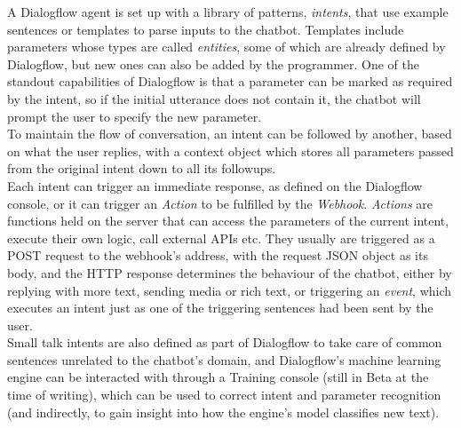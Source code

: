 A Dialogflow agent is set up with a library of patterns, \textit{intents}, that use example sentences or templates to parse inputs to the chatbot. Templates include parameters whose types are called \textit{entities}, some of which are already defined by Dialogflow, but new ones can also be added by the programmer. One of the standout capabilities of Dialogflow is that a parameter can be marked as required by the intent, so if the initial utterance does not contain it, the chatbot will prompt the user to specify the new parameter. \\
To maintain the flow of conversation, an intent can be followed by another, based on what the user replies, with a context object which stores all parameters passed from the original intent down to all its followups. \\
Each intent can trigger an immediate response, as defined on the Dialogflow console, or it can trigger an \textit{Action} to be fulfilled by the \textit{Webhook}. \textit{Actions} are functions held on the server that can access the parameters of the current intent, execute their own logic, call external APIs etc. They usually are triggered as a POST request to the webhook's address, with the request JSON object as its body, and the HTTP response determines the behaviour of the chatbot, either by replying with more text, sending media or rich text, or triggering an \textit{event}, which executes an intent just as one of the triggering sentences had been sent by the user. \\
Small talk intents are also defined as part of Dialogflow to take care of common sentences unrelated to the chatbot's domain, and Dialogflow's machine learning engine can be interacted with through a Training console (still in Beta at the time of writing), which can be used to correct intent and parameter recognition (and indirectly, to gain insight into how the engine's model classifies new text).


